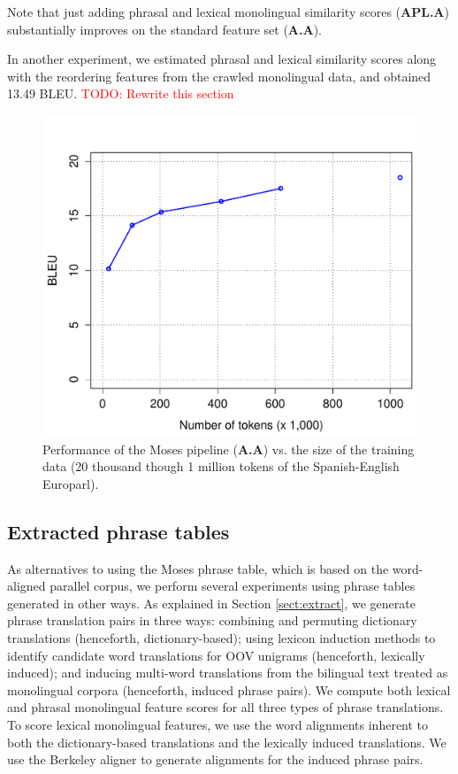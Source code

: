 \documentclass[11pt]{article}
\newcommand{\todo}[1]{\textcolor{red}{TODO: #1}}
\begin{document}
Note that just adding phrasal and lexical monolingual similarity scores ({\bf APL.A}) substantially improves on the standard feature set ({\bf A.A}).

In another experiment, we estimated phrasal and lexical similarity scores along with the reordering features from the crawled monolingual data, and obtained 13.49 BLEU. \todo{Rewrite this section}

\begin{figure}[t]
\begin{center}
\includegraphics[width=\linewidth]{../figures/learning/learning.pdf}
\caption{Performance of the Moses pipeline ({\bf A.A}) vs. the size of the training data (20 thousand though 1 million tokens of the Spanish-English Europarl).}
\label{fig:learning}
\end{center}
\vskip -0.2in
\end{figure}

\subsection{Extracted phrase tables}
As alternatives to using the Moses phrase table, which is based on the word-aligned parallel corpus, we perform several experiments using phrase tables generated in other ways. As explained in Section \ref{sect:extract}, we generate phrase translation pairs in three ways: combining and permuting dictionary translations (henceforth, dictionary-based); using lexicon induction methods to identify candidate word translations for OOV unigrams (henceforth, lexically induced); and inducing multi-word translations from the bilingual text treated as monolingual corpora (henceforth, induced phrase pairs). We compute both lexical and phrasal monolingual feature scores for all three types of phrase translations. To score lexical monolingual features, we use the word alignments inherent to both the dictionary-based translations and the lexically induced translations. We use the Berkeley aligner \cite{add} to generate alignments for the induced phrase pairs. 
\end{document}
